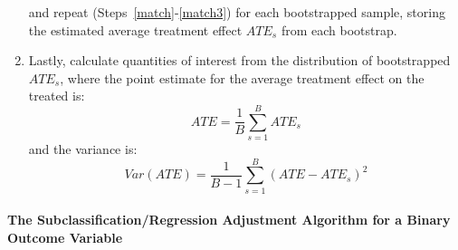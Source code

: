 \documentclass[11pt,titlepage]{article}
\begin{document}
\begin{enumerate}
  and repeat (Steps~\ref{match}-\ref{match3}) for each bootstrapped sample, storing
  the estimated average treatment effect $ATE_s$ from each bootstrap. 
\item Lastly, calculate quantities of interest from the distribution
  of bootstrapped $ATE_s$, where the point estimate for the average
  treatment effect on the treated is:
\begin{equation}
    ATE = \frac{1}{B} \sum_{s=1}^{B} ATE_s
\end{equation}
and the variance is:
\begin{equation}
    Var(ATE)= \frac{1}{B-1} \sum_{s=1}^{B} (ATE-ATE_s)^2
\end{equation}
\end{enumerate}

\paragraph{The Subclassification/Regression Adjustment Algorithm for a Binary Outcome
  Variable}
\end{document}
